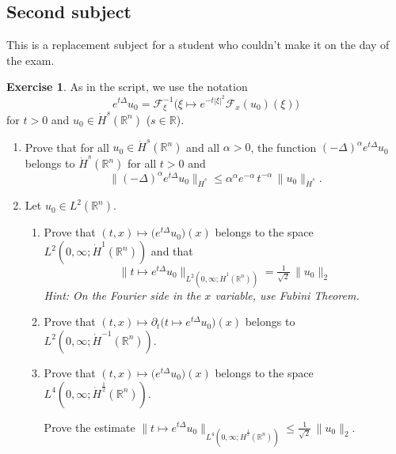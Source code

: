 \documentclass[a4paper, 12pt]{article}
\theoremstyle{plain}
\theoremstyle{definition}
\newtheorem{exercise}{Exercise}
\theoremstyle{remark}
\numberwithin{equation}{section}
\begin{document}
\subsection{Second subject}

This is a replacement subject for a student who couldn't make it on the day of the exam.

\begin{exercise}
As in the script, we use the notation 
 \[
 e^{t\Delta}u_0={\mathscr{F}}_\xi^{-1}\bigl(\xi\mapsto e^{-t|\xi|^2}{\mathscr{F}}_x(u_0)(\xi)\bigr)
 \] 
 for $t>0$ and $u_0\in \dot H^s({\mathds{R}}^n)$ ($s\in {\mathds{R}}$).
%
\begin{enumerate}
\item 
Prove that for all $u_0\in \dot H^s({\mathds{R}}^n)$ and all $\alpha>0$, the function $(-\Delta)^\alpha e^{t\Delta}u_0$ belongs
to $\dot H^s({\mathds{R}}^n)$ for all $t>0$ and
\[
\|(-\Delta)^\alpha e^{t\Delta}u_0 \|_{\dot H^s}\le \alpha^\alpha e^{-\alpha} \, t^{-\alpha}\,\|u_0\|_{\dot H^s}.
\]
\item
Let $u_0\in L^2({\mathds{R}}^n)$. 
%
\begin{enumerate}
\item 
Prove that $(t,x)\mapsto \bigl(e^{t\Delta}u_0\bigr)(x)$ 
belongs to the space $L^2(0,\infty;\dot H^1({\mathds{R}}^n))$ and that
\[
\bigl\|t\mapsto e^{t\Delta}u_0\bigr\|_{L^2(0,\infty;\dot H^1({\mathds{R}}^n))}=\tfrac{1}{\sqrt{2}}\,\|u_0\|_2
\]
{\small\sl Hint: On the Fourier side in the $x$ variable, use Fubini Theorem.}
\item 
Prove that $(t,x)\mapsto \partial_t\bigl(t\mapsto e^{t\Delta}u_0\bigr)(x)$ belongs to $L^2(0,\infty;\dot H^{-1}({\mathds{R}}^n))$.
\item 
Prove that $(t,x)\mapsto \bigl(e^{t\Delta}u_0\bigr)(x)$ belongs to the space $L^4(0,\infty;\dot H^{\frac{1}{2}}({\mathds{R}}^n))$.

\noindent 
Prove the estimate $\|t\mapsto e^{t\Delta}u_0\|_{L^4(0,\infty;\dot H^{\frac{1}{2}}({\mathds{R}}^n))}\le \frac{1}{\sqrt{2}}\,\|u_0\|_2$.
\end{enumerate}
\end{enumerate}
\end{exercise}
\end{document}
